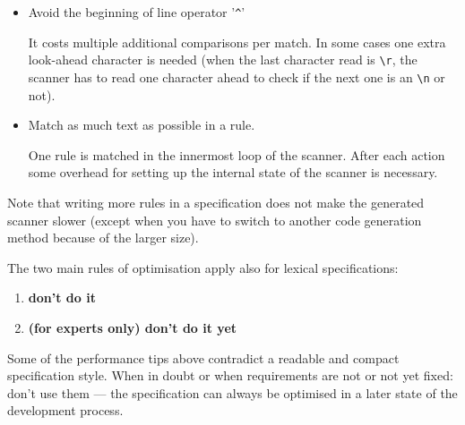 \documentclass[11pt]{scrartcl}
\begin{document}
\begin{itemize}
  In the best case, the trailing context will first have to be read and 
  then (because it is not to be consumed) re-read again. The cases of 
  fixed-length look-ahead and fixed-length base expressions are handled efficiently
  by matching the concatenation and then pushing back the required amount
  of characters. This extends to the case of a disjunction of fixed-length
  look-ahead expressions such as \verb+r1 / \r|\n|\r\n+. All other cases
  \verb+r1 / r2+ are handled by first scanning the concatenation of 
  \verb+r1+ and \verb+r2+, and then finding the correct end of \verb+r1+. 
  The end of \verb+r1+ is found by scanning forwards in the match again,
  marking all possible \verb+r1+ terminations, and then scanning the reverse
  of \verb+r2+ backwards from the end until a start of \verb+r2+ intersects
  with an end of \verb+r1+. This algorithm is linear in the size of the input
  (not quadratic or worse as backtracking is), but about a factor of 2 slower 
  than normal scanning. It also consumes memory proportional to the size
  of the matched input for \verb+r1 r2+. 

\item
  Avoid the beginning of line operator '\verb+^+'
  
  It costs multiple additional comparisons per match. In some
  cases one extra look-ahead character is needed (when the last character read is
  \verb+\r+, the scanner has to read one character ahead to check if
  the next one is an \verb+\n+ or not).

\item
  Match as much text as possible in a rule.
  
  One rule is matched in the innermost loop of the scanner.  After
  each action some overhead for setting up the internal state of the
   scanner is necessary.
\end{itemize}

Note that writing more rules in a specification does not make the generated
scanner slower (except when you have to switch to another code generation
method because of the larger size).

The two main rules of optimisation apply also for lexical specifications:
\begin{enumerate}
\item {\bf don't do it}
\item {\bf (for experts only) don't do it yet}
\end{enumerate}

Some of the performance tips above contradict a readable and compact
specification style. When in doubt or when requirements are not or not
yet fixed: don't use them --- the specification can always be optimised
in a later state of the development process.
\end{document}
